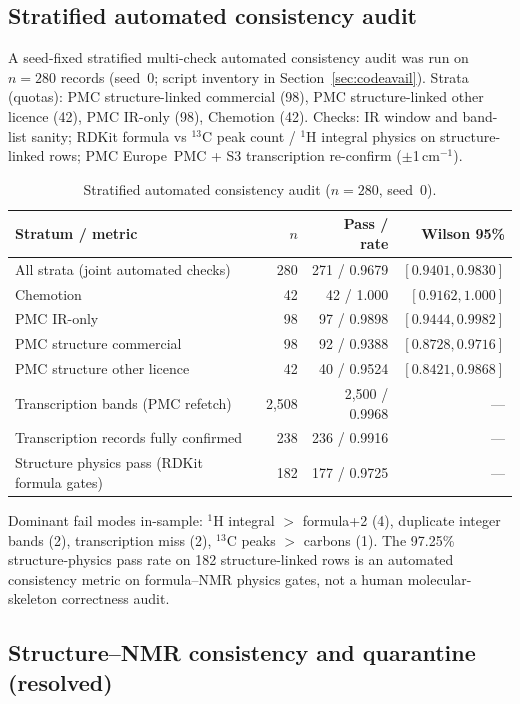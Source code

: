 \documentclass[pdflatex,sn-nature]{sn-jnl}
\begin{document}
\subsection{Stratified automated consistency audit}

A seed-fixed stratified multi-check automated consistency audit was run on
$n=280$ records (seed~0; script inventory in Section~\ref{sec:codeavail}).
Strata (quotas): PMC structure-linked commercial (98), PMC structure-linked
other licence (42), PMC IR-only (98), Chemotion (42).
Checks: IR window and band-list sanity; RDKit formula vs $^{13}$C peak count /
$^{1}$H integral physics on structure-linked rows; PMC Europe~PMC + S3
transcription re-confirm ($\pm$1\,cm$^{-1}$).

\begin{table}[ht]
\caption{Stratified automated consistency audit ($n=280$, seed~0).}\label{tab:consistency}
\small
\begin{tabular}{@{}lrrr@{}}
\toprule
Stratum / metric & $n$ & Pass / rate & Wilson 95\% \\
\midrule
All strata (joint automated checks) & 280 & 271 / 0.9679 & $[0.9401, 0.9830]$ \\
Chemotion & 42 & 42 / 1.000 & $[0.9162, 1.000]$ \\
PMC IR-only & 98 & 97 / 0.9898 & $[0.9444, 0.9982]$ \\
PMC structure commercial & 98 & 92 / 0.9388 & $[0.8728, 0.9716]$ \\
PMC structure other licence & 42 & 40 / 0.9524 & $[0.8421, 0.9868]$ \\
Transcription bands (PMC refetch) & 2,508 & 2,500 / 0.9968 & --- \\
Transcription records fully confirmed & 238 & 236 / 0.9916 & --- \\
Structure physics pass (RDKit formula gates) & 182 & 177 / 0.9725 & --- \\
\bottomrule
\end{tabular}
\end{table}

Dominant fail modes in-sample: $^{1}$H integral $>$ formula+2 (4), duplicate
integer bands (2), transcription miss (2), $^{13}$C peaks $>$ carbons (1).
The 97.25\% structure-physics pass rate on 182 structure-linked rows is an
automated consistency metric on formula--NMR physics gates, not a human
molecular-skeleton correctness audit.

\subsection{Structure--NMR consistency and quarantine (resolved)}
\end{document}
